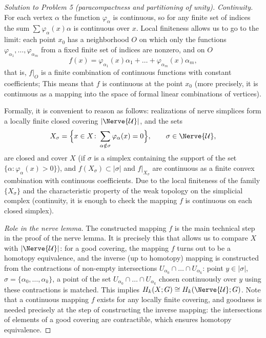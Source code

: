 \documentclass[a4paper,12pt]{report}
\begin{document}
\begin{proof}[Solution to Problem \textup{5} \textup{(}paracompactness and partitioning of unity\textup{)}]
\emph{Continuity.} For each vertex $\alpha$ the function $\varphi_\alpha$ is continuous, so for any finite set of indices the sum $\sum\varphi_\alpha(x)\alpha$ is continuous over $x$. Local finiteness allows us to go to the limit: each point $x_0$ has a neighborhood $O$ on which only the functions $\varphi_{\alpha_1},\dots,\varphi_{\alpha_m}$ from a fixed finite set of indices are nonzero, and on $O$
\[
f(x)=\varphi_{\alpha_1}(x)\alpha_1+\dots+\varphi_{\alpha_m}(x)\alpha_m ,
\]
that is, $f|_O$ is a finite combination of continuous functions with constant coefficients; This means that $f$ is continuous at the point $x_0$ \textup{(}more precisely, it is continuous as a mapping into the space of formal linear combinations of vertices\textup{)}.

Formally, it is convenient to reason as follows: realizations of nerve simplices form a locally finite closed covering $|\Nerve{\mathcal U}|$, and the sets
\[
X_\sigma=\Bigl\{x\in X\colon\sum_{\alpha\notin\sigma}\varphi_\alpha(x)=0\Bigr\},\qquad\sigma\in\Nerve{\mathcal U},
\]
are closed and cover $X$ \textup{(}if $\sigma$ is a simplex containing the support of the set $\{\alpha\colon\varphi_\alpha(x)>0\}$\textup{)}, and $f(X_\sigma)\subset|\sigma|$ and $f|_{X_\sigma}$ are continuous as a finite convex combination with continuous coefficients. Due to the local finiteness of the family $\{X_\sigma\}$ and the characteristic property of the weak topology on the simplicial complex \textup{(}continuity, it is enough to check the mapping $f$ is continuous on each closed simplex\textup{)}.

\emph{Role in the nerve lemma.} The constructed mapping $f$ is the main technical step in the proof of the nerve lemma. It is precisely this that allows us to compare $X$ with $|\Nerve{\mathcal U}|$: for a good covering, the mapping $f$ turns out to be a homotopy equivalence, and the inverse \textup{(}up to homotopy\textup{)} mapping is constructed from the contractions of non-empty intersections $U_{\alpha_0}\cap\dots\cap U_{\alpha_k}$: point $y\in|\sigma|$, $\sigma=\{\alpha_0,\dots,\alpha_k\}$, a point of the set $U_{\alpha_0}\cap\dots\cap U_{\alpha_k}$ chosen continuously over $y$ using these contractions is matched. This implies $H_k(X;G)\cong H_k(\Nerve{\mathcal U};G)$. Note that a continuous mapping $f$ exists for any locally finite covering, and goodness is needed precisely at the step of constructing the inverse mapping: the intersections of elements of a good covering are contractible, which ensures homotopy equivalence.
\end{proof}
\end{document}
